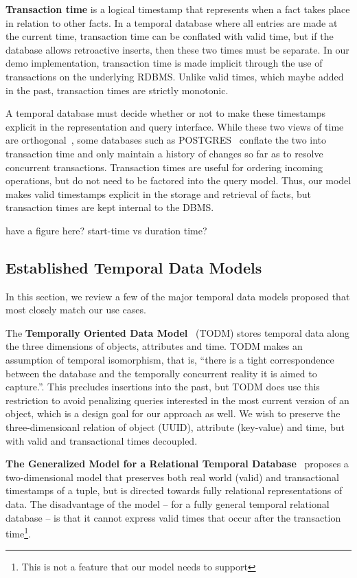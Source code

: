\textbf{Transaction time} is a logical timestamp that represents when a fact
takes place in relation to other facts. In a temporal database where all
entries are made at the current time, transaction time can be conflated with
valid time, but if the database allows retroactive inserts, then these two
times must be separate. In our demo implementation, transaction time is made
implicit through the use of transactions on the underlying RDBMS. Unlike
valid times, which maybe added in the past, transaction times are strictly
monotonic.

A temporal database must decide whether or not to make these timestamps
explicit in the representation and query interface.  While these two views of
time are orthogonal~\cite{snodgrass1986temporal}, some databases such as
POSTGRES~\cite{stonebraker1990implementation} conflate the two into transaction
time and only maintain a history of changes so far as to resolve concurrent
transactions. Transaction times are useful for ordering incoming operations,
but do not need to be factored into the query model. Thus, our model makes
valid timestamps explicit in the storage and retrieval of facts, but
transaction times are kept internal to the DBMS.

have a figure here? start-time vs duration time?
\fi

\subsection{Established Temporal Data Models}

In this section, we review a few of the major temporal data models proposed that
most closely match our use cases.

The \textbf{Temporally Oriented Data Model}~\cite{ariav1986temporally} (TODM)
stores temporal data along the three dimensions of objects, attributes and
time. TODM makes an assumption of temporal isomorphism, that is, ``there is a tight
correspondence between the database and the temporally concurrent reality it is
aimed to capture.''\cite{ariav1986temporally}. This precludes
insertions into the past, but TODM does use this restriction to avoid
penalizing queries interested in the most current version of an object, which
is a design goal for our approach as well. We wish to preserve the three-dimensioanl
relation of object (UUID), attribute (key-value) and time, but with valid
and transactional times decoupled.

\textbf{The Generalized Model for a Relational Temporal Database}~\cite{gadia1988generalized} proposes a two-dimensional
model that preserves both real world (valid) and transactional timestamps of a
tuple, but is directed towards fully relational representations of data.  The
disadvantage of the model -- for a fully general temporal relational database
-- is that it cannot express valid times that occur after the transaction
time\footnote{This is not a feature that our model needs to support}.


